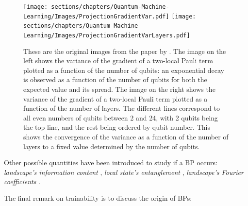 \begin{figure}
    \centering
    \texttt{[image: sections/chapters/Quantum-Machine-Learning/Images/ProjectionGradientVar.pdf]}
    \texttt{[image: sections/chapters/Quantum-Machine-Learning/Images/ProjectionGradientVarLayers.pdf]}
    \caption{These are the original images from the paper by \cite{McClean_2018}. 
    The image on the left shows the variance of the gradient of a two-local Pauli term plotted as a function of 
    the number of qubits: an exponential decay is observed as a function of the number 
    of qubits for both the expected value and its spread.
    The image on the right shows the variance of the gradient of a two-local Pauli term plotted as a function of the 
    number of layers. The different lines correspond to all even numbers of qubits between 
    2 and 24, with 2 qubits being the top line, and the rest being ordered by qubit number. This shows 
    the convergence of the variance as a function of the number of layers to a fixed value determined by the 
    number of qubits.
    }
    \label{figure:McClean}
\end{figure}

Other possible quantities have been introduced to study if a BP occurs: \textit{landscape's information content} \cite{P_rez_Salinas_2024}, 
\textit{local state's entanglement} \cite{Sack_2022}, \textit{landscape's Fourier coefficients} \cite{okumura2023, Nemkov_2023}.

The final remark on trainability is to discuss the origin of BPs:

